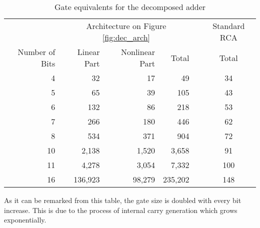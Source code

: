 \documentclass[12pt]{toptesi}
\begin{document}
\begin{table}
   \centering
        \caption{Gate equivalents for the decomposed adder}
				\vspace{6pt}
        \begin{tabular}{rrrrcc}
				\toprule
				& \multicolumn{3}{c}{Architecture on Figure \ref{fig:dec_arch}} && Standard RCA \\
                Number of Bits & Linear Part &  Nonlinear Part & Total && Total\\
                \midrule
                4  &  32     &	17	    &	49      && \phantom{1}34 \\
                5  &  65     &	39	    &	105     && \phantom{1}43 \\  
                6  &  132    &	86	    &	218     && \phantom{1}53  \\  
                7  &  266    &	180	    &	446     && \phantom{1}62  \\  
                8  &  534    &	371	    &	904     && \phantom{1}72  \\  
                10 &  2,138   &	1,520    &	3,658    && \phantom{1}91  \\  
                11 &  4,278   &	3,054	  &	7,332    && 100  \\  
                16 &  136,923 &	98,279	  &	235,202  && 148  \\  
                \bottomrule
        \end{tabular}
        \label{tab:asic_areas}
\end{table}

As it can be remarked from this table, the gate size is doubled with every bit increase. This is due to the process of internal carry generation which grows exponentially.
\end{document}
